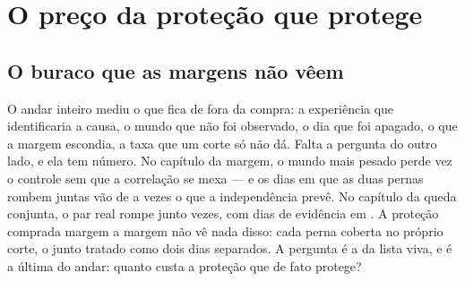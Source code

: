 
\chapter{O preço da proteção que protege}\label{cap:preco}

\section{O buraco que as margens não vêem}

O andar inteiro mediu o que fica de fora da compra: a experiência que identificaria a causa, o mundo
que não foi observado, o dia que foi apagado, o que a margem escondia, a taxa que um corte só não
dá. Falta a pergunta do outro lado, e ela tem número. No capítulo da margem, o mundo mais pesado
perde \numMargemPerdaRazao{} vez o controle sem que a correlação se mexa --- e os dias em que as duas
pernas rombem juntas vão de \numMargemExcessoControle{} a \numMargemExcessoDezPorCento{} vezes o que
a independência prevê. No capítulo da queda conjunta, o par real rompe junto \numConjuntaExcesso{}
vezes, com \numConjuntaJuntos{} dias de evidência em \numConjuntaDias. A proteção comprada margem a
margem não vê nada disso: cada perna coberta no próprio corte, o junto tratado como dois dias
separados. A pergunta é a da lista viva, e é a última do andar: quanto custa a proteção que de fato
protege?

